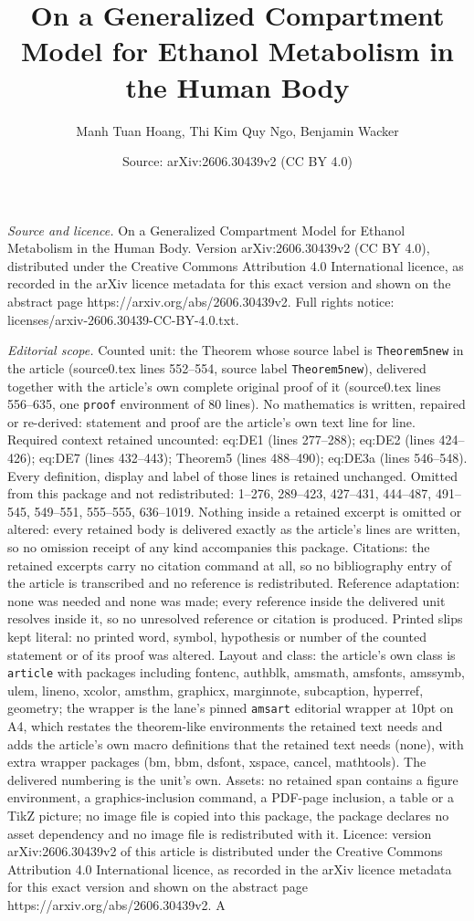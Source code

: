 \documentclass[10pt,a4paper]{amsart}
\title[On a Generalized Compartment Model for Ethanol Metabolism in]{On a Generalized Compartment Model for Ethanol Metabolism in the Human Body}
\author{Manh Tuan Hoang, Thi Kim Quy Ngo, Benjamin Wacker}
\date{Source: arXiv:2606.30439v2 (CC BY 4.0)}
\begin{document}
\maketitle

\noindent\emph{Source and licence.} On a Generalized Compartment Model for Ethanol Metabolism in the Human Body. Version arXiv:2606.30439v2 (CC BY 4.0), distributed under the Creative Commons Attribution 4.0 International licence, as recorded in the arXiv licence metadata for this exact version and shown on the abstract page https://arxiv.org/abs/2606.30439v2. Full rights notice: licenses/arxiv-2606.30439-CC-BY-4.0.txt.\par\smallskip

\noindent\textit{Editorial scope.} Counted unit: the Theorem whose source label is \texttt{Theorem5new} in the article (source0.tex lines 552--554, source label \texttt{Theorem5new}), delivered together with the article's own complete original proof of it (source0.tex lines 556--635, one \texttt{proof} environment of 80 lines). No mathematics is written, repaired or re-derived: statement and proof are the article's own text line for line. Required context retained uncounted: eq:DE1 (lines 277--288); eq:DE2 (lines 424--426); eq:DE7 (lines 432--443); Theorem5 (lines 488--490); eq:DE3a (lines 546--548). Every definition, display and label of those lines is retained unchanged. Omitted from this package and not redistributed: 1--276, 289--423, 427--431, 444--487, 491--545, 549--551, 555--555, 636--1019. Nothing inside a retained excerpt is omitted or altered: every retained body is delivered exactly as the article's lines are written, so no omission receipt of any kind accompanies this package. Citations: the retained excerpts carry no citation command at all, so no bibliography entry of the article is transcribed and no reference is redistributed. Reference adaptation: none was needed and none was made; every reference inside the delivered unit resolves inside it, so no unresolved reference or citation is produced. Printed slips kept literal: no printed word, symbol, hypothesis or number of the counted statement or of its proof was altered. Layout and class: the article's own class is \texttt{article} with packages including fontenc, authblk, amsmath, amsfonts, amssymb, ulem, lineno, xcolor, amsthm, graphicx, marginnote, subcaption, hyperref, geometry; the wrapper is the lane's pinned \texttt{amsart} editorial wrapper at 10pt on A4, which restates the theorem-like environments the retained text needs and adds the article's own macro definitions that the retained text needs (none), with extra wrapper packages (bm, bbm, dsfont, xspace, cancel, mathtools). The delivered numbering is the unit's own. Assets: no retained span contains a figure environment, a graphics-inclusion command, a PDF-page inclusion, a table or a TikZ picture; no image file is copied into this package, the package declares no asset dependency and no image file is redistributed with it. Licence: version arXiv:2606.30439v2 of this article is distributed under the Creative Commons Attribution 4.0 International licence, as recorded in the arXiv licence metadata for this exact version and shown on the abstract page https://arxiv.org/abs/2606.30439v2. A 
\end{document}

